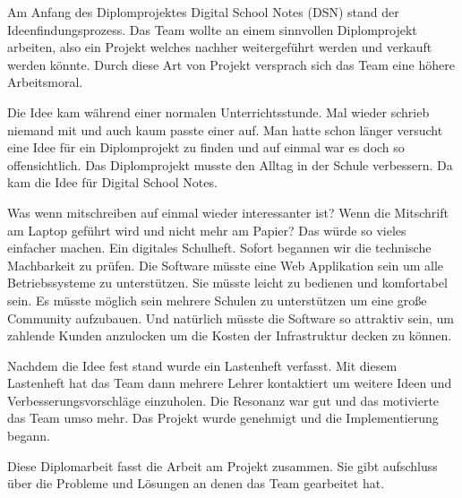 
Am Anfang des Diplomprojektes Digital School Notes (\gls{DSN}) stand der Ideenfindungsprozess. Das Team wollte an einem sinnvollen Diplomprojekt arbeiten, also ein Projekt welches nachher weitergeführt werden und verkauft werden könnte. Durch diese Art von Projekt versprach sich das Team eine höhere Arbeitsmoral. 

Die Idee kam während einer normalen Unterrichtsstunde. Mal wieder schrieb niemand mit und auch kaum passte einer auf. Man hatte schon länger versucht eine Idee für ein Diplomprojekt zu finden und auf einmal war es doch so offensichtlich. Das Diplomprojekt musste den Alltag in der Schule verbessern. Da kam die Idee für Digital School Notes.

Was wenn mitschreiben auf einmal wieder interessanter ist? Wenn die Mitschrift am Laptop geführt wird und nicht mehr am Papier? Das würde so vieles einfacher machen. Ein digitales Schulheft. Sofort begannen wir die technische Machbarkeit zu prüfen. Die Software müsste eine Web Applikation sein um alle Betriebssysteme zu unterstützen. Sie müsste leicht zu bedienen und komfortabel sein. Es müsste möglich sein mehrere Schulen zu unterstützen um eine große Community aufzubauen. Und natürlich müsste die Software so attraktiv sein, um zahlende Kunden anzulocken um die Kosten der Infrastruktur decken zu können.

Nachdem die Idee fest stand wurde ein Lastenheft verfasst. Mit diesem Lastenheft hat das Team dann mehrere Lehrer kontaktiert um weitere Ideen und Verbesserungsvorschläge einzuholen. Die Resonanz war gut und das motivierte das Team umso mehr. Das Projekt wurde genehmigt und die Implementierung begann.

Diese Diplomarbeit fasst die Arbeit am Projekt zusammen. Sie gibt aufschluss über die Probleme und Lösungen an denen das Team gearbeitet hat.